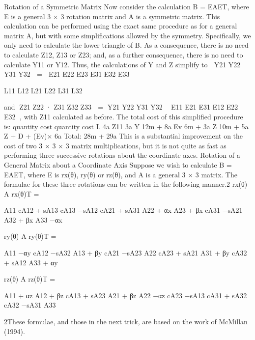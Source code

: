 Rotation of a Symmetric Matrix Now consider the calculation B = EAET, where E is a general 3 × 3 rotation matrix and A is a symmetric matrix. This calculation can be performed using the exact same procedure as for a general matrix A, but with some simplifications allowed by the symmetry. Specifically, we only need to calculate the lower triangle of B. As a consequence, there is no need to calculate Z12, Z13 or Z23; and, as a further consequence, there is no need to calculate Y11 or Y12. Thus, the calculations of Y and Z simplify to  Y21 Y22 Y31 Y32  =  E21 E22 E23 E31 E32 E33 

L11 L12 L21 L22 L31 L32

and Z21 Z22 · Z31 Z32 Z33  = Y21 Y22 Y31 Y32  E11 E21 E31 E12 E22 E32  , with Z11 calculated as before. The total cost of this simplified procedure is: quantity cost quantity cost L 4a Z11 3a Y 12m + 8a Ev 6m + 3a Z 10m + 5a Z + D + (Ev)× 6a Total: 28m + 29a This is a substantial improvement on the cost of two 3 × 3 × 3 matrix multiplications, but it is not quite as fast as performing three successive rotations about the coordinate axes. Rotation of a General Matrix about a Coordinate Axis Suppose we wish to calculate B = EAET, where E is rx(θ), ry(θ) or rz(θ), and A is a general 3 × 3 matrix. The formulae for these three rotations can be written in the following manner.2 rx(θ) A rx(θ)T =

A11 cA12 + sA13 cA13 −sA12 cA21 + sA31 A22 + αx A23 + βx cA31 −sA21 A32 + βx A33 −αx

ry(θ) A ry(θ)T =

A11 −αy cA12 −sA32 A13 + βy cA21 −sA23 A22 cA23 + sA21 A31 + βy cA32 + sA12 A33 + αy

rz(θ) A rz(θ)T =

A11 + αz A12 + βz cA13 + sA23 A21 + βz A22 −αz cA23 −sA13 cA31 + sA32 cA32 −sA31 A33

2These formulae, and those in the next trick, are based on the work of McMillan (1994).

